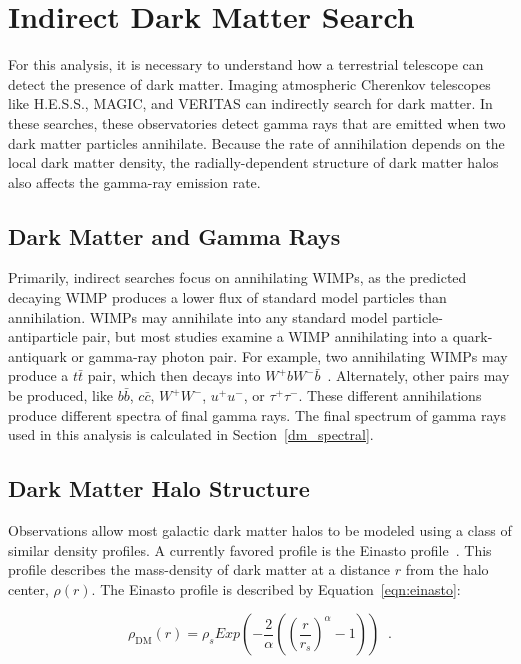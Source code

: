 \section{Indirect Dark Matter Search}
  For this analysis, it is necessary to understand how a terrestrial telescope can detect the presence of dark matter.
  Imaging atmospheric Cherenkov telescopes like H.E.S.S., MAGIC, and VERITAS can indirectly search for dark matter.
  In these searches, these observatories detect gamma rays that are emitted when two dark matter particles annihilate.
  Because the rate of annihilation depends on the local dark matter density, the radially-dependent structure of dark matter halos also affects the gamma-ray emission rate.

  \subsection{Dark Matter and Gamma Rays}
    Primarily, indirect searches focus on annihilating WIMPs, as the predicted decaying WIMP produces a lower flux of standard model particles than annihilation.
    WIMPs may annihilate into any standard model particle-antiparticle pair, but most studies examine a WIMP annihilating into a quark-antiquark or gamma-ray photon pair.
    For example, two annihilating WIMPs may produce a $t\bar{t}$ pair, which then decays into $W^+bW^-\bar{b}$~\cite{pdg2016}.
    Alternately, other pairs may be produced, like  $b\bar{b}$, $c\bar{c}$, $W^+W^-$, $u^+u^-$, or $\tau^+\tau^-$.
    These different annihilations produce different spectra of final gamma rays.
    The final spectrum of gamma rays used in this analysis is calculated in Section~\ref{dm_spectral}.
  
  \subsection{Dark Matter Halo Structure}\label{dm_spatial}
    
    Observations allow most galactic dark matter halos to be modeled using a class of similar density profiles.
    A currently favored profile is the Einasto profile~\cite{einastoprofile1,einastoprofile2}.
    This profile describes the mass-density of dark matter at a distance $r$ from the halo center, $\rho(r)$.
    The Einasto profile is described by Equation~\ref{eqn:einasto}:

    \begin{equation} \label{eqn:einasto}
      \rho_{\textrm{DM}} \left( r \right) = \rho_{s} Exp \left( - \frac{2}{\alpha} \left( {\left( \frac{r}{r_s} \right)}^{\alpha} - 1 \right) \right) \;\; .
    \end{equation}
    
